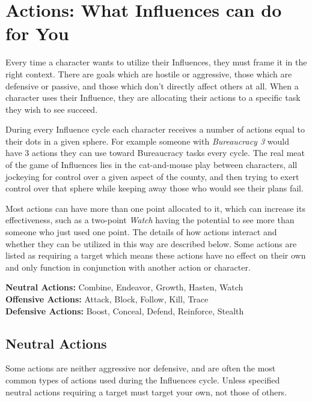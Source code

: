 \section{Actions: What Influences can do for You}

Every time a character wants to utilize their Influences, they must frame it in the right 
context.  There are goals which are hostile or aggressive, those which are defensive or 
passive, and those which don't directly affect others at all.  When a character uses their 
Influence, they are allocating their actions to a specific task they wish to see succeed.

During every Influence cycle each character receives a number of actions equal to their 
dots in a given sphere.  For example someone with \emph{Bureaucracy 3} would have 3 actions 
they can use toward Bureaucracy tasks every cycle.  The real meat of the game of Influences 
lies in the cat-and-mouse play between characters, all jockeying for control over a given 
aspect of the county, and then trying to exert control over that sphere while keeping away 
those who would see their plans fail.

Most actions can have more than one point allocated to it, which can increase its effectiveness, 
such as a two-point \emph{Watch} having the potential to see more than someone who just used 
one point.  The details of how actions interact and whether they can be utilized in this way are 
described below.  Some actions are listed as requiring a target which means these actions have no 
effect on their own and only function in conjunction with another action or character. \medskip

\indent\textbf{Neutral Actions:} Combine, Endeavor, Growth, Hasten, Watch \\
\indent\textbf{Offensive Actions:} Attack, Block, Follow, Kill, Trace \\
\indent\textbf{Defensive Actions:} Boost, Conceal, Defend, Reinforce, Stealth

\subsection{Neutral Actions}
Some actions are neither aggressive nor defensive, and are often the most common types of actions 
used during the Influences cycle.  Unless specified neutral actions requiring a target must target your 
own, not those of others. \\

